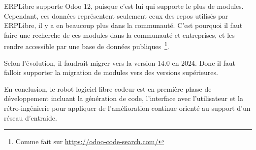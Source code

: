 ERPLibre supporte Odoo 12, puisque c’est lui qui supporte le plus de modules. Cependant, ces données représentent seulement ceux des repos utilisés par ERPLibre, il y a en beaucoup plus dans la communauté. C’est pourquoi il faut faire une recherche de ces modules dans la communauté et entreprises, et les rendre accessible par une base de données publiques~\footnote{Comme fait sur \url{https://odoo-code-search.com/}}.

Selon l’évolution, il faudrait migrer vers la version 14.0 en 2024. Donc il faut falloir supporter la migration de modules vers des versions supérieures.







En conclusion, le robot logiciel libre codeur est en première phase de développement incluant la génération de code, l'interface avec l'utilisateur et la rétro-ingénierie pour appliquer de l'amélioration continue orienté au support d'un réseau d'entraide.

